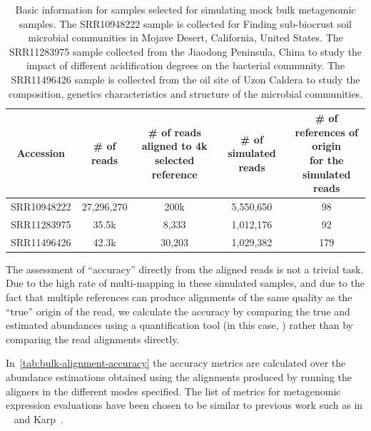 \begin{table}\centering
\begin{tabular}{c||cccc}
    \toprule
    Accession
    & \# of reads
    & \parbox[c]{2cm}{\# of reads \\ aligned to 4k selected reference }
    & \# of simulated reads
    & \parbox[c]{3cm}{\# of references of origin \\ for the simulated reads \\ }  \\
    \midrule
    SRR10948222
    & 27,296,270 & 200k & 5,550,650 & 98 \\
    \midrule
    SRR11283975
    & 35.5k & 8,333 & 1,012,176 & 92 \\
    \midrule
    SRR11496426
    & 42.3k & 30,203 & 1,029,382 & 179 \\
    \bottomrule
\end{tabular}
\caption[Information for samples selected for simulating mock bulk metagenomic samples]
{Basic information for samples selected for simulating mock bulk metagenomic samples. 
The SRR10948222 sample is collected for Finding sub-biocrust soil microbial communities in Mojave Desert, 
California, United States. The SRR11283975 sample collected from the Jiaodong Peninsula, China to study the 
impact of different acidification degrees on the bacterial community. The SRR11496426 sample is collected 
from the oil site of Uzon Caldera to study the composition, genetics characteristics and structure of the 
microbial communities.}
\label{tab:metagenome_sample_info}
\end{table}

The assessment of ``accuracy'' directly from the aligned reads is not a trivial task.
Due to the high rate of multi-mapping in these simulated samples, and due to the fact that multiple references 
can produce alignments of the same quality as the ``true'' origin of the read, we calculate the accuracy by 
comparing the true and estimated abundances using a quantification tool (in this case, \salmon) rather than 
by comparing the read alignments directly.

In~\cref{tab:bulk-alignment-accuracy} the accuracy metrics are calculated
over the abundance estimations obtained using the alignments produced by 
running the aligners in the different modes specified. The list of metrics for
metagenomic expression evaluations have been chosen to be similar to previous
work such as in \br~\citep{lu2017bracken} and Karp~\citep{reppell2018using}.

